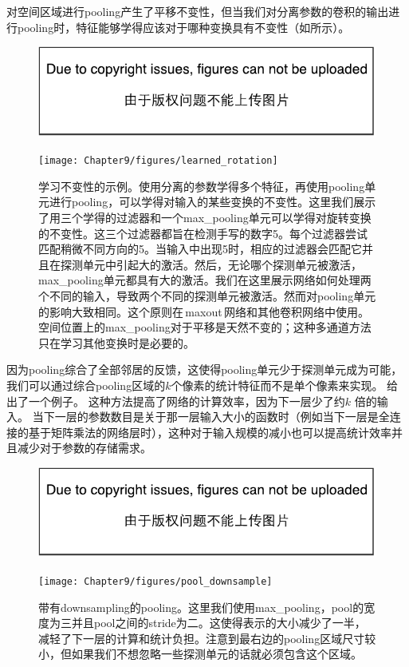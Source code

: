 对空间区域进行\gls{pooling}产生了平移不变性，但当我们对分离参数的卷积的输出进行\gls{pooling}时，特征能够学得应该对于哪种变换具有不变性（如所示）。
\begin{figure}[!htb]
\ifOpenSource
\centerline{\includegraphics{figure.pdf}}
\else
\centerline{\texttt{[image: Chapter9/figures/learned\_rotation]}}
\fi
\caption{学习不变性的示例。使用分离的参数学得多个特征，再使用\gls{pooling}单元进行\gls{pooling}，可以学得对输入的某些变换的不变性。这里我们展示了用三个学得的过滤器和一个\gls{max_pooling}单元可以学得对旋转变换的不变性。这三个过滤器都旨在检测手写的数字5。每个过滤器尝试匹配稍微不同方向的5。当输入中出现5时，相应的过滤器会匹配它并且在探测单元中引起大的激活。然后，无论哪个探测单元被激活，\gls{max_pooling}单元都具有大的激活。我们在这里展示网络如何处理两个不同的输入，导致两个不同的探测单元被激活。然而对\gls{pooling}单元的影响大致相同。这个原则在\,\gls{maxout}\,网络\citep{Goodfellow-et-al-ICML2013}和其他卷积网络中使用。空间位置上的\gls{max_pooling}对于平移是天然不变的；这种多通道方法只在学习其他变换时是必要的。}
\label{fig:chap9_learned_rotation}
\end{figure}

 
因为\gls{pooling}综合了全部邻居的反馈，这使得\gls{pooling}单元少于探测单元成为可能，我们可以通过综合\gls{pooling}区域的$k$个像素的统计特征而不是单个像素来实现。
给出了一个例子。
这种方法提高了网络的计算效率，因为下一层少了约$k$ 倍的输入。
当下一层的参数数目是关于那一层输入大小的函数时（例如当下一层是全连接的基于矩阵乘法的网络层时），这种对于输入规模的减小也可以提高统计效率并且减少对于参数的存储需求。
\begin{figure}[!htb]
\ifOpenSource
\centerline{\includegraphics{figure.pdf}}
\else
\centerline{\texttt{[image: Chapter9/figures/pool\_downsample]}}
\fi
\caption{带有\gls{downsampling}的\gls{pooling}。这里我们使用\gls{max_pooling}，\gls{pool}的宽度为三并且\gls{pool}之间的\gls{stride}为二。这使得表示的大小减少了一半，减轻了下一层的计算和统计负担。注意到最右边的\gls{pooling}区域尺寸较小，但如果我们不想忽略一些探测单元的话就必须包含这个区域。}
\label{fig:chap9_pool_downsample}
\end{figure}


